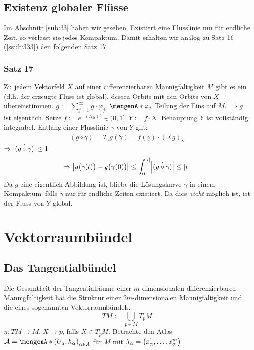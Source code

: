 \subsection{Existenz globaler Flüsse} %
\label{sub:34}
Im Abschnitt \ref{sub:33} haben wir gesehen: Existiert eine Flusslinie nur für endliche Zeit, so verlässt sie jedes Kompaktum. Damit erhalten wir analog zu Satz 16 (\ref{ssub:333}) den folgenden Satz 17

\subsubsection{Satz 17} %
\label{ssub:341}
Zu jedem Vektorfeld $X$ auf einer differenzierbaren Mannigfaltigkeit $M$ gibt es ein  (d.h. der erzeugte Fluss ist global), dessen
Orbits mit den Orbits von $X$ übereinstimmen.
$g := \sum_{j=1}^{\infty} g \cdot \varphi_j$, $\set{\varphi_j}$ Teilung der Eins auf $M$. $\Rightarrow g$ ist eigentlich. Setze $f := e^{- (X g)^2} \in (0,1]$, 
$Y := f \cdot X$. Behauptung $Y$ ist vollständig integrabel. Entlang einer Flusslinie $\gamma$ von $Y$ gilt: 
\[
	\dot{(g \circ \gamma)} = T_{\gamma} g (\dot{\gamma}) = f(\gamma) \cdot (X g)_\gamma
\]
$\Rightarrow \dot{\abs*{(g \circ \gamma)} } \le 1$ 
\[
	\Rightarrow \abs*{ g \enbrace[\big]{\gamma(t)} - g \enbrace[\big]{\gamma(0)}  } \le \int_{0} ^{\abs*{t} } \abs*{\dot{(g \circ \gamma)}} \le \abs*{t}    
\]
Da $g$ eine eigentlich Abbildung ist, bliebe die Lösungskurve $\gamma$ in einem Kompaktum, falls $\gamma$ nur für endliche Zeiten existiert. Da dies \emph{nicht} möglich 
ist, ist der Fluss von $Y$ global. \bewende {}
\newpage

\section{Vektorraumbündel} %
\label{sec:4}

\subsection{Das Tangentialbündel} %
\label{sub:41}
Die Gesamtheit der Tangentialräume einer $m$-dimensionalen differenzierbaren Mannigfaltigkeit hat die Struktur einer $2m$-dimensionalen Mannigfaltigkeit und die eines
sogenannten Vektorraumbündels.
\[
	TM := \bigcup_{p \in M} T_pM
\]
$\pi : T M  \to M $, $X \mapsto p$, falls $X \in T_pM$. Betrachte den Atlas $\mathcal{A} = \set{(U_\alpha, h_\alpha)}_{\alpha \in A} $ für $M$ mit 
$h_\alpha = \enbrace*{x^1_\alpha, \ldots , x^m_\alpha}$

